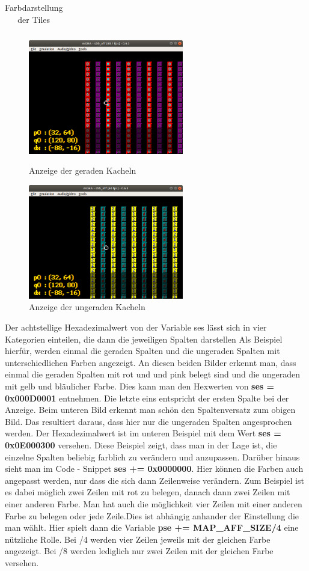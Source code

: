 \begin{table}[h]
{\begin{tabular}{|l|l|l|l|l|l|l|l|l|}
\end{tabular}%
}
\caption{Farbdarstellung der Tiles}
\label{tilesfarbe}
\end{table}

\begin{figure}
	\includegraphics[height=50mm]{img/gerade.png}
	\caption{Anzeige der geraden Kacheln}
	\includegraphics[height=50mm]{img/ungerade.png}
	\caption{Anzeige der ungeraden Kacheln}
\end{figure}
Der achtstellige Hexadezimalwert von der Variable ses lässt sich in vier Kategorien einteilen, die dann die jeweiligen Spalten darstellen
Als Beispiel hierfür, werden einmal die geraden Spalten und die ungeraden Spalten mit unterschiedlichen Farben angezeigt. 
An diesen beiden Bilder erkennt man, dass einmal die geraden Spalten mit rot und und pink belegt sind und die ungeraden mit gelb und bläulicher Farbe. Dies kann man den Hexwerten von \textbf{ses = 0x000D0001} entnehmen. Die letzte eins entspricht der ersten Spalte bei der Anzeige. Beim unteren Bild erkennt man schön den Spaltenversatz zum obigen Bild. Das resultiert daraus, dass hier nur die ungeraden Spalten angesprochen werden. Der Hexadezimalwert ist im unteren Beispiel mit dem Wert \textbf{ses = 0x0E000300} versehen. Diese Beispiel zeigt, dass man in der Lage ist, die einzelne Spalten beliebig farblich zu verändern und anzupassen. Darüber hinaus sieht man im Code - Snippet \textbf{ses += 0x0000000}. Hier können die Farben auch angepasst werden, nur dass die sich dann Zeilenweise verändern. Zum Beispiel ist es dabei möglich zwei Zeilen mit rot zu belegen, danach dann zwei Zeilen mit einer anderen Farbe. Man hat auch die möglichkeit vier Zeilen mit einer anderen Farbe zu belegen oder jede Zeile.Dies ist abhängig anhander der Einstellung die man wählt. Hier spielt dann die Variable \textbf{pse += MAP\_AFF\_SIZE/4} eine nützliche Rolle. Bei /4 werden vier Zeilen jeweils mit der gleichen Farbe angezeigt. Bei /8 werden lediglich nur zwei Zeilen mit der gleichen Farbe versehen.

